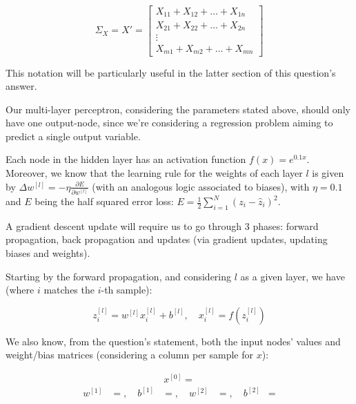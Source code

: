 \documentclass[12pt]{article}
\begin{document}
\begin{enumerate}[leftmargin=\labelsep]
        $$
          \Sigma_X = X' = \begin{bmatrix}
            X_{11} + X_{12} + \hdots + X_{1n} \\
            X_{21} + X_{22} + \hdots + X_{2n} \\
            \vdots                            \\
            X_{m1} + X_{m2} + \hdots + X_{mn}
          \end{bmatrix}
        $$

        This notation will be particularly useful in the latter section of this
        question's answer.

        Our multi-layer perceptron, considering the parameters stated above, should only
        have one output-node, since we're considering a regression problem aiming to
        predict a single output variable.

        Each node in the hidden layer has an activation function $f(x) = e^{0.1x}$.
        Moreover, we know that the learning rule for the weights of each layer $l$
        is given by $\Delta w^{[l]} = - \eta \frac{\partial E}{\partial w^{[l]}}$ (with an analogous
        logic associated to biases), with $\eta = 0.1$ and $E$ being the half squared error loss:
        $E = \frac{1}{2} \sum_{i=1}^N (z_i - \hat{z}_i)^2$.

        A gradient descent update will require us to go through 3 phases: forward
        propagation, back propagation and updates (via gradient updates, updating
        biases and weights).

        Starting by the forward propagation, and considering $l$ as a given layer,
        we have (where $i$ matches the $i$-th sample):

        \begin{equation*}
          z_i^{[l]} = w^{[l]} x_i^{[l]} + b^{[l]}, \quad x_i^{[l]} = f\left(z_i^{[l]}\right)
        \end{equation*}

        We also know, from the question's statement, both the input nodes' values
        and weight/bias matrices (considering a column per sample for $x$):

        \begin{equation*}
          \begin{aligned}
            x^{[0]} = 
          \end{aligned}
        \end{equation*}
        \begin{equation*}
          \begin{aligned}
            w^{[1]} & = , \quad
            b^{[1]} & = , \quad
            w^{[2]} & = , \quad
            b^{[2]} & = 
          \end{aligned}
        \end{equation*}


\end{enumerate}
\end{document}
